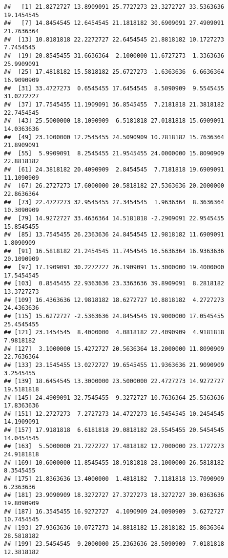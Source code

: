 \documentclass[]{book}
\begin{document}
\begin{verbatim}
##   [1] 21.8272727 13.8909091 25.7727273 23.3272727 33.5363636 19.1454545
##   [7] 14.8454545 12.6454545 21.1818182 30.6909091 27.4909091 21.7636364
##  [13] 10.8181818 22.2272727 22.6454545 21.8818182 10.1727273  7.7454545
##  [19] 20.8545455 31.6636364  2.1000000 11.6727273  1.3363636 25.9909091
##  [25] 17.4818182 15.5818182 25.6727273 -1.6363636  6.6636364 16.9090909
##  [31] 33.4727273  0.6545455 17.6454545  8.5090909  9.5545455 31.0272727
##  [37] 17.7545455 11.1909091 36.8545455  7.2181818 21.3818182 22.7454545
##  [43] 25.5000000 18.1090909  6.5181818 27.0181818 15.6909091 14.0363636
##  [49] 23.1000000 12.2545455 24.5090909 10.7818182 15.7636364 21.8909091
##  [55]  5.9909091  8.2545455 21.9545455 24.0000000 15.8090909 22.8818182
##  [61] 24.3818182 20.4090909  2.8454545  7.7181818 19.6909091 11.1090909
##  [67] 26.2727273 17.6000000 20.5818182 27.5363636 20.2000000 22.8636364
##  [73] 22.4727273 32.9545455 27.3454545  1.9636364  8.3636364 10.3090909
##  [79] 14.9272727 33.4636364 14.5181818 -2.2909091 22.9545455 15.8545455
##  [85] 13.7545455 26.2363636 24.8454545 12.9818182 11.6909091  1.8090909
##  [91] 16.5818182 21.2454545 11.7454545 16.5636364 16.9363636 20.1090909
##  [97] 17.1909091 30.2272727 26.1909091 15.3000000 19.4000000 17.5454545
## [103]  0.8545455 22.9363636 23.3363636 39.8909091  8.2818182 13.3727273
## [109] 16.4363636 12.9818182 18.6272727 10.8818182  4.2727273 24.4363636
## [115] 15.6272727 -2.5363636 24.8454545 19.9000000 17.0545455 25.4545455
## [121] 23.1454545  8.4000000  4.0818182 22.4090909  4.9181818  7.9818182
## [127]  3.1000000 15.4272727 20.5636364 18.2000000 11.8090909 22.7636364
## [133] 23.1545455 13.0272727 19.6545455 11.9363636 21.9090909  3.2545455
## [139] 18.6454545 13.3000000 23.5000000 22.4727273 14.9272727 19.5181818
## [145] 24.4909091 32.7545455  9.3272727 10.7636364 25.5363636 17.8363636
## [151] 12.2727273  7.2727273 14.4727273 16.5454545 10.2454545 14.1909091
## [157] 17.9181818  6.6181818 29.0818182 28.5545455 20.5454545 14.0454545
## [163]  5.5000000 21.7272727 17.4818182 12.7000000 23.1727273 24.9181818
## [169] 10.6000000 11.8545455 18.9181818 28.1000000 26.5818182  8.3545455
## [175] 21.8363636 13.4000000  1.4818182  7.1181818 13.7090909  6.2363636
## [181] 23.9090909 18.3272727 27.3727273 18.3272727 30.0363636 19.8090909
## [187] 16.3545455 16.9272727  4.1090909 24.0090909  3.6272727 10.7454545
## [193] 27.9363636 10.0727273 14.8818182 15.2818182 15.8636364 28.5818182
## [199] 23.5454545  9.2000000 25.2363636 28.5090909  7.0181818 12.3818182

\end{verbatim}
\end{document}
